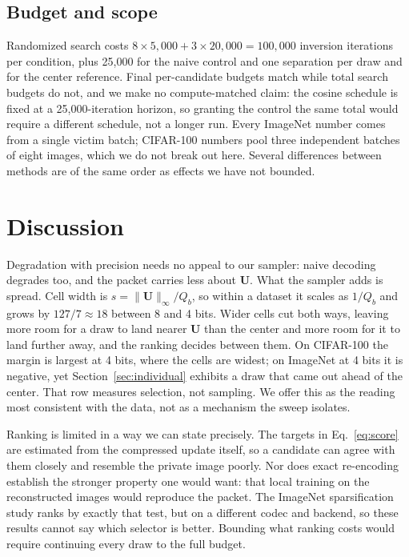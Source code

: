 \documentclass{article}
\newcommand{\U}{\mathbf{U}}
\begin{document}
\subsection{Budget and scope}
\label{sec:budget}
Randomized search costs $8\times5{,}000+3\times20{,}000=100{,}000$ inversion
iterations per condition, plus 25,000 for the naive control and one separation
per draw and for the center reference. Final per-candidate budgets match while
total search budgets do not, and we make no compute-matched claim: the cosine
schedule is fixed at a 25,000-iteration horizon, so granting the control the
same total would require a different schedule, not a longer run. Every
ImageNet number comes from a single victim batch; CIFAR-100 numbers pool three
independent batches of eight images, which we do not break out here. Several
differences between methods are of the same order as effects we have not
bounded.


\section{Discussion}
\label{sec:discussion}
Degradation with precision needs no appeal to our sampler: naive decoding
degrades too, and the packet carries less about $\U$. What the sampler adds is
spread. Cell width is $s=\|\U\|_\infty/Q_b$, so within a dataset it scales as
$1/Q_b$ and grows by $127/7\approx18$ between 8 and 4 bits. Wider cells cut
both ways, leaving more room for a draw to land nearer $\U$ than the center
and more room for it to land further away, and the ranking decides between
them. On CIFAR-100 the margin is largest at 4 bits, where the cells are
widest; on ImageNet at 4 bits it is negative, yet Section~\ref{sec:individual}
exhibits a draw that came out ahead of the center. That row measures
selection, not sampling. We offer this as the reading most consistent with the
data, not as a mechanism the sweep isolates.

Ranking is limited in a way we can state precisely. The targets in
Eq.~\eqref{eq:score} are estimated from the compressed update itself, so a
candidate can agree with them closely and resemble the private image poorly.
Nor does exact re-encoding establish the stronger property one would want:
that local training on the reconstructed images would reproduce the packet.
The ImageNet sparsification study ranks by exactly that test, but on a
different codec and backend, so these results cannot say which selector is
better. Bounding what ranking costs would require continuing every draw to the
full budget.
\end{document}
